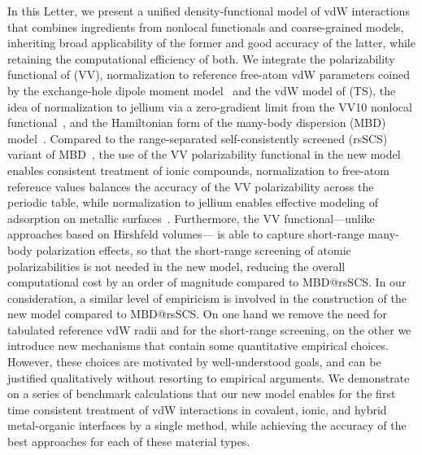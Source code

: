 In this Letter, we present a unified density-functional model of vdW interactions that combines ingredients from nonlocal functionals and coarse-grained models, inheriting broad applicability of the former and good accuracy of the latter, while retaining the computational efficiency of both.
We integrate the polarizability functional of \citet{VydrovPRA10} (VV), normalization to reference free-atom vdW parameters coined by the exchange-hole dipole moment model~\citep{BeckeJCP06} and the vdW model of \citet{TkatchenkoPRL09} (TS), the idea of normalization to jellium via a zero-gradient limit from the VV10 nonlocal functional~\citep{VydrovJCP10a}, and the Hamiltonian form of the many-body dispersion (MBD) model~\citep{TkatchenkoJCP13}.
Compared to the range-separated self-consistently screened (rsSCS) variant of MBD~\citep{AmbrosettiJCP14}, the use of the VV polarizability functional in the new model enables consistent treatment of ionic compounds, normalization to free-atom reference values balances the accuracy of the VV polarizability across the periodic table, while normalization to jellium enables effective modeling of adsorption on metallic surfaces~\citep{RuizPRL12}.
Furthermore, the VV functional---unlike approaches based on Hirshfeld volumes---
is able to capture short-range many-body polarization effects, so that the short-range screening of atomic polarizabilities is not needed in the new model, reducing the overall computational cost by an order of magnitude compared to MBD@rsSCS\@.
In our consideration, a similar level of empiricism is involved in the construction of the new model compared to MBD@rsSCS\@.
On one hand we remove the need for tabulated reference vdW radii and for the short-range screening, on the other we introduce new mechanisms that contain some quantitative empirical choices.
However, these choices are motivated by well-understood goals, and can be justified qualitatively without resorting to empirical arguments.
We demonstrate on a series of benchmark calculations that our new model enables for the first time consistent treatment of vdW interactions in covalent, ionic, and hybrid metal-organic interfaces by a single method, while achieving the accuracy of the best approaches for each of these material types.

